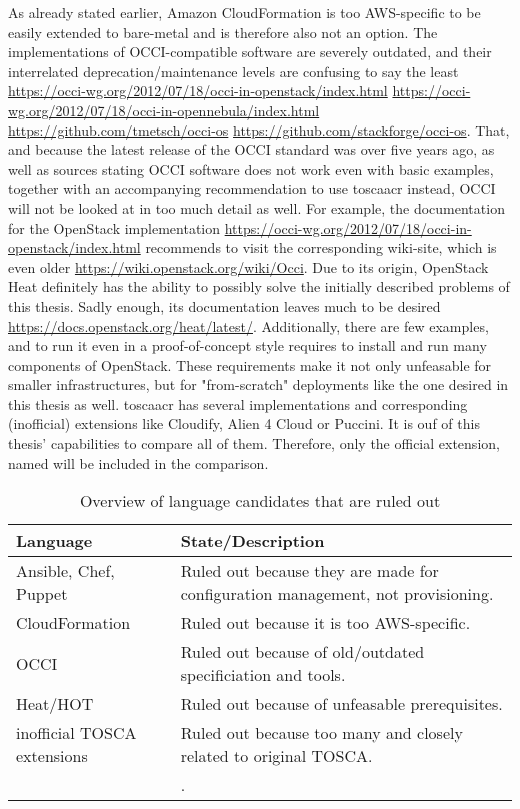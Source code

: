 \newline
As already stated earlier, Amazon CloudFormation is too AWS-specific to be easily extended to bare-metal and is therefore also not an option.
\newline
The implementations of OCCI-compatible software are severely outdated, and their interrelated deprecation/maintenance levels are confusing to say the least \url{https://occi-wg.org/2012/07/18/occi-in-openstack/index.html} \url{https://occi-wg.org/2012/07/18/occi-in-opennebula/index.html} \url{https://github.com/tmetsch/occi-os} \url{https://github.com/stackforge/occi-os}.
That, and because the latest release of the OCCI standard was over five years ago, as well as sources stating OCCI software does not work even with basic examples, together with an accompanying recommendation to use \gls{toscaacr} instead, %
OCCI will not be looked at in too much detail as well. For example, the documentation for the OpenStack implementation \url{https://occi-wg.org/2012/07/18/occi-in-openstack/index.html} recommends to visit the corresponding wiki-site, which is even older \url{https://wiki.openstack.org/wiki/Occi}.
\newline
Due to its origin, OpenStack Heat definitely has the ability to possibly solve the initially described problems of this thesis. Sadly enough, its documentation leaves much to be desired \url{https://docs.openstack.org/heat/latest/}. Additionally, there are few examples, and to run it even in a proof-of-concept style requires to install and run many components of OpenStack. These requirements make it not only unfeasable for smaller infrastructures, but for "from-scratch" deployments like the one desired in this thesis as well.
\newline
\Gls{toscaacr} has several implementations and corresponding (inofficial) extensions like Cloudify, Alien 4 Cloud or Puccini. It is ouf of this thesis' capabilities to compare all of them. Therefore, only the official extension, named  will be included in the comparison.

\begin{table}[H]
  \caption{Overview of language candidates that are ruled out}
  \begin{tabular}{ | l | l | }
    \hline
    Language & State/Description \\
    \hline
    Ansible, Chef, Puppet & Ruled out because they are made for configuration management, not provisioning. \\
    CloudFormation & Ruled out because it is too AWS-specific. \\
    OCCI & Ruled out because of old/outdated specificiation and tools. \\
    Heat/HOT & Ruled out because of unfeasable prerequisites. \\
    inofficial TOSCA extensions & Ruled out because too many and closely related to original TOSCA. \\
    \hline & . \\
  \end{tabular}
  \label{tab:afterculling}
\end{table}

